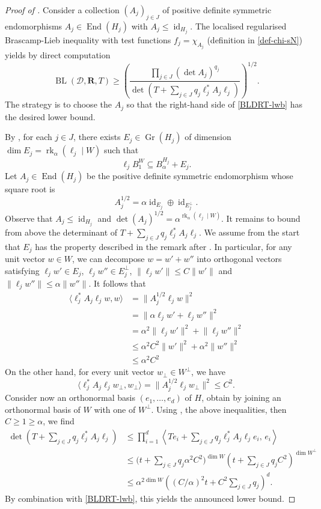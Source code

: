\documentclass[10pt,a4paper]{amsart}
\DeclareMathOperator{\BL}{BL}
\DeclareMathOperator{\End}{End}
\DeclareMathOperator{\Gr}{Gr}
\newcommand{\bR}{\mathbf{R}}
\DeclareMathOperator{\id}{id}
\newcommand{\norm}[1]{\lVert#1\rVert}   %
\DeclareMathOperator{\rk}{rk}
\newcommand{\sD} {{\mathscr D}}
\renewcommand{\subset}{\subseteq}
\begin{document}
\begin{proof}[Proof of ]
Consider a collection  $(A_j)_{j \in J}$ of positive definite symmetric endomorphisms $A_{j}\in \End(H_{j})$ with $A_{j}\leq  \id_{H_j}$. The localised regularised  Brascamp-Lieb inequality with  test functions $f_{j}=\chi_{A_{j}}$ (definition in \eqref{def-chi-sN}) yields by direct computation
\begin{equation}\label{BLDRT-lwb}
\BL(\sD, \bR, T) \geq \left(\frac{\prod_{j \in J} (\det A_j)^{q_{j}}}{\det\left(T + \sum\nolimits_{j \in J} q_j \ell_j^* A_j \ell_j \right)}\right)^{1/2}.
\end{equation}
The strategy is to choose the $A_{j}$ so that the right-hand side of \eqref{BLDRT-lwb} has the desired lower bound.


By , for each $j \in J$, there exists $E_j \in \Gr(H_j)$ of dimension $\dim E_j = \rk_\alpha(\ell_j \mid W)$ such that
\[
\ell_j B^W_1 \subset B^{H_j}_\alpha + E_j.
\]
Let $A_j \in \End(H_j)$ be the positive definite symmetric endomorphism whose square root is
\[
A_j^{1/2} = \alpha \id_{E_j} \oplus \id_{E_j^\perp}.
\]
Observe that $A_j \leq \id_{H_j}$ and $\det(A_j)^{1/2} = \alpha^{\rk_\alpha(\ell_j \mid W)}$. It remains to bound from above the determinant of $T+\sum_{j \in J} q_j \ell_j^* A_j \ell_j$. We assume from the start that $E_{j}$ has the property described in the remark after .
In particular, for any unit vector $w \in W$, we can decompose $w = w' + w''$ into orthogonal vectors satisfying $\ell_j w' \in E_j$, $\ell_j w'' \in E_j^\perp$, $\norm{\ell_j w'} \leq C\norm{w'}$ and $\norm{\ell_j w''} \leq \alpha \norm{w''}$.
It follows that
\begin{align*}
\langle \ell_j^* A_j \ell_j w, w \rangle &= \norm{A_j^{1/2} \ell_j w}^2 \\
&= \norm{ \alpha\ell_j w' + \ell_j w''}^2\\
&= \alpha^2 \norm{\ell_j w'}^2 + \norm{\ell_j w''}^2\\
&\leq \alpha^2 C^2\norm{w'}^2 + \alpha^2 \norm{w''}^2\\
&\leq \alpha^2 C^2
\end{align*}
On the other hand, for every unit vector $w_{\perp} \in W^\perp$, we have
\[
\langle \ell_j^* A_j \ell_j w_{\perp}, w_{\perp} \rangle = \norm{A_j^{1/2} \ell_j w_{\perp}}^2 \leq C^2.
\]
Consider now an orthonormal basis $(e_1, \dotsc, e_d)$ of $H$, obtain by joining an orthonormal basis of $W$ with one of $W^\perp$.
Using , the above inequalities, then $C\geq 1\geq \alpha$, we find
\begin{align*}
\det\left(T + \sum\nolimits_{j \in J} q_j \ell_j^* A_j \ell_j \right) &\leq \prod_{i = 1}^d \left\langle Te_i + \sum\nolimits_{j \in J} q_j \ell_j^* A_j \ell_j e_i, \,e_i \right\rangle\\
&\leq \Big(t + \sum\nolimits_{j \in J} q_j \alpha^2C^2 \Bigr)^{\dim W} \left(t + \sum\nolimits_{j \in J} q_j C^2\right)^{\dim W^\perp}\\
&\leq  \alpha^{2 \dim W}\left( (C/\alpha)^2 t + C^2\sum\nolimits_{j \in J} q_j \right)^d.
\end{align*}
By combination with \eqref{BLDRT-lwb}, this yields the announced lower bound.
\end{proof}
\end{document}
